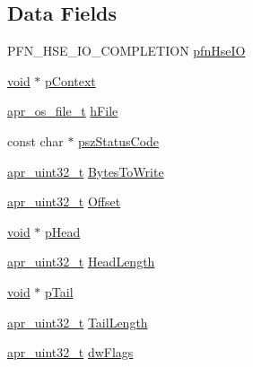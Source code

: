\subsection*{Data Fields}
\begin{DoxyCompactItemize}
\item 
P\+F\+N\+\_\+\+H\+S\+E\+\_\+\+I\+O\+\_\+\+C\+O\+M\+P\+L\+E\+T\+I\+ON \hyperlink{structHSE__TF__INFO_a4901c8d82dfa72b7da28e4c43d48ae75}{pfn\+Hse\+IO}
\item 
\hyperlink{group__MOD__ISAPI_gacd6cdbf73df3d9eed42fa493d9b621a6}{void} $\ast$ \hyperlink{structHSE__TF__INFO_ade1f758dfb0b5623b37b0a40407a9048}{p\+Context}
\item 
\hyperlink{group__apr__portabile_ga885491b889a4a719549650d3a370fd34}{apr\+\_\+os\+\_\+file\+\_\+t} \hyperlink{structHSE__TF__INFO_ae1b25d6d15592e4a9f57f7e0b1e38a73}{h\+File}
\item 
const char $\ast$ \hyperlink{structHSE__TF__INFO_a481dded9279f577c79fe45a73469dd17}{psz\+Status\+Code}
\item 
\hyperlink{group__apr__platform_ga558548a135d8a816c4787250744ea147}{apr\+\_\+uint32\+\_\+t} \hyperlink{structHSE__TF__INFO_a432725e6a9b606d8e7a23ee37e1aabc0}{Bytes\+To\+Write}
\item 
\hyperlink{group__apr__platform_ga558548a135d8a816c4787250744ea147}{apr\+\_\+uint32\+\_\+t} \hyperlink{structHSE__TF__INFO_a0862fd24194836454548cd1c41cd3976}{Offset}
\item 
\hyperlink{group__MOD__ISAPI_gacd6cdbf73df3d9eed42fa493d9b621a6}{void} $\ast$ \hyperlink{structHSE__TF__INFO_ac3a4b98fff16b6bf80538e5969fe6a3c}{p\+Head}
\item 
\hyperlink{group__apr__platform_ga558548a135d8a816c4787250744ea147}{apr\+\_\+uint32\+\_\+t} \hyperlink{structHSE__TF__INFO_a2ecc5ee7a7f8921b858f6375b71df551}{Head\+Length}
\item 
\hyperlink{group__MOD__ISAPI_gacd6cdbf73df3d9eed42fa493d9b621a6}{void} $\ast$ \hyperlink{structHSE__TF__INFO_a796e0b1293dee6b34a3ef4be5e19a95e}{p\+Tail}
\item 
\hyperlink{group__apr__platform_ga558548a135d8a816c4787250744ea147}{apr\+\_\+uint32\+\_\+t} \hyperlink{structHSE__TF__INFO_a652100b5362a06b7c06e6c97cfd8d064}{Tail\+Length}
\item 
\hyperlink{group__apr__platform_ga558548a135d8a816c4787250744ea147}{apr\+\_\+uint32\+\_\+t} \hyperlink{structHSE__TF__INFO_aa69cf35ccc976026639165335d8658f8}{dw\+Flags}
\end{DoxyCompactItemize}


